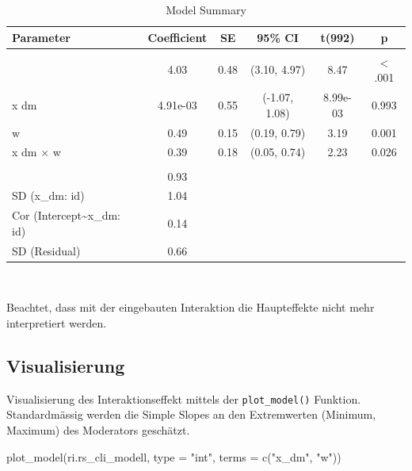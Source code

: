 \documentclass[
  letterpaper,
  DIV=11,
  numbers=noendperiod]{scrreprt}
\newenvironment{Shaded}{\begin{snugshade}}{\end{snugshade}}
\newcommand{\AttributeTok}[1]{\textcolor[rgb]{0.40,0.45,0.13}{#1}}
\newcommand{\FunctionTok}[1]{\textcolor[rgb]{0.28,0.35,0.67}{#1}}
\newcommand{\NormalTok}[1]{\textcolor[rgb]{0.00,0.23,0.31}{#1}}
\newcommand{\StringTok}[1]{\textcolor[rgb]{0.13,0.47,0.30}{#1}}
\begin{document}
\begin{table}
\caption*{
{\large Model Summary}
} 
\fontsize{12.0pt}{14.4pt}\selectfont
\begin{tabular*}{\linewidth}{@{\extracolsep{\fill}}lccccc}
\toprule
Parameter & Coefficient & SE & 95\% CI & t(992) & p \\ 
\midrule\addlinespace[2.5pt]
\multicolumn{6}{l}{{\slshape Fixed Effects }} \\[2.5pt] 
\midrule\addlinespace[2.5pt]
{(Intercept)} & 4.03 & 0.48 & (3.10, 4.97) & 8.47 & < .001 \\ 
{x dm} & 4.91e-03 & 0.55 & (-1.07, 1.08) & 8.99e-03 & 0.993  \\ 
{w} & 0.49 & 0.15 & (0.19, 0.79) & 3.19 & 0.001  \\ 
{x dm × w} & 0.39 & 0.18 & (0.05, 0.74) & 2.23 & 0.026  \\ 
\midrule\addlinespace[2.5pt]
\multicolumn{6}{l}{{\slshape Random Effects }} \\[2.5pt] 
\midrule\addlinespace[2.5pt]
{SD (Intercept: id)} & 0.93 &  &  &  &  \\ 
{SD (x\_dm: id)} & 1.04 &  &  &  &  \\ 
{Cor (Intercept\textasciitilde{}x\_dm: id)} & 0.14 &  &  &  &  \\ 
{SD (Residual)} & 0.66 &  &  &  &  \\ 
\bottomrule
\end{tabular*}
\begin{minipage}{\linewidth}
\\
\end{minipage}
\end{table}

Beachtet, dass mit der eingebauten Interaktion die Haupteffekte nicht
mehr interpretiert werden.

\subsection{Visualisierung}\label{visualisierung-3}

Visualisierung des Interaktionseffekt mittels der \texttt{plot\_model()}
Funktion. Standardmässig werden die Simple Slopes an den Extremwerten
(Minimum, Maximum) des Moderators geschätzt.

\begin{Shaded}
\begin{Highlighting}[]
\FunctionTok{plot\_model}\NormalTok{(ri.rs\_cli\_modell, }\AttributeTok{type =} \StringTok{"int"}\NormalTok{, }\AttributeTok{terms =} \FunctionTok{c}\NormalTok{(}\StringTok{"x\_dm"}\NormalTok{, }\StringTok{"w"}\NormalTok{))}
\end{Highlighting}
\end{Shaded}
\end{document}
